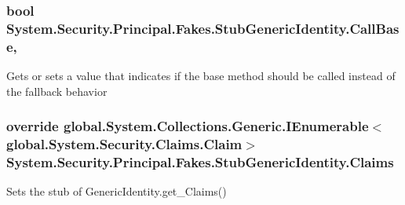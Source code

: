\hypertarget{class_system_1_1_security_1_1_principal_1_1_fakes_1_1_stub_generic_identity_aa43e15de09d92b50c24d857101bbc1ee}{
\subsubsection[{Call\-Base}]{\setlength{\rightskip}{0pt plus 5cm}bool System.\-Security.\-Principal.\-Fakes.\-Stub\-Generic\-Identity.\-Call\-Base\hspace{0.3cm}{\ttfamily [get]}, {\ttfamily [set]}}}\label{class_system_1_1_security_1_1_principal_1_1_fakes_1_1_stub_generic_identity_aa43e15de09d92b50c24d857101bbc1ee}


Gets or sets a value that indicates if the base method should be called instead of the fallback behavior

\hypertarget{class_system_1_1_security_1_1_principal_1_1_fakes_1_1_stub_generic_identity_af57442c4c90145f8bf45833aac59521d}{
\subsubsection[{Claims}]{\setlength{\rightskip}{0pt plus 5cm}override global.\-System.\-Collections.\-Generic.\-I\-Enumerable$<$global.\-System.\-Security.\-Claims.\-Claim$>$ System.\-Security.\-Principal.\-Fakes.\-Stub\-Generic\-Identity.\-Claims\hspace{0.3cm}{\ttfamily [get]}}}\label{class_system_1_1_security_1_1_principal_1_1_fakes_1_1_stub_generic_identity_af57442c4c90145f8bf45833aac59521d}


Sets the stub of Generic\-Identity.\-get\-\_\-\-Claims()

